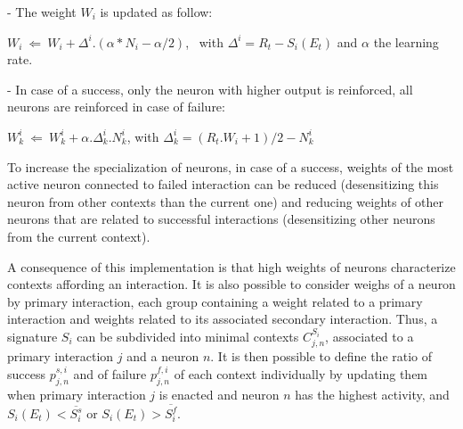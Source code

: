 \documentclass[conference]{IEEEtran}
\begin{document}
- The weight $W_i$ is updated as follow:

$W_i ~\Leftarrow~ W_i+ \Delta^i . (\alpha * N_i - \alpha /2)$, ~with $\Delta^i=R_t-S_i(E_t)$
and $\alpha$ the learning rate.

- In case of a success, only the neuron with higher output is reinforced, all neurons are reinforced in case of failure:

$W_k^i ~\Leftarrow~ W_k^i+ \alpha . \Delta_k^i . N_k^i$,
with $\Delta_k^i=(R_t.W_i + 1)/2 - N_k^i$


To increase the specialization of neurons, in case of a success, weights of the most active neuron connected to failed interaction can be reduced (desensitizing this neuron from other contexts than the current one) and reducing weights of other neurons that are related to successful interactions (desensitizing other neurons from the current context).


A consequence of this implementation is that high weights of neurons characterize contexts affording an interaction. It is also possible to consider weighs of a neuron by primary interaction, each group containing a weight related to a primary interaction and weights related to its associated secondary interaction. Thus, a signature $S_i$ can be subdivided into minimal contexts $C_{j,n}^{S_i}$, associated to a primary interaction $j$ and a neuron $n$. It is then possible to define the ratio of success $p_{j,n}^{s,i}$ and of failure $p_{j,n}^{f,i}$ of each context individually by updating them when primary interaction $j$ is enacted and neuron $n$ has the highest activity, and $S_i(E_t)<\overline{S_i^s}$ or $S_i(E_t)>\overline{S_i^f}$.
\end{document}
